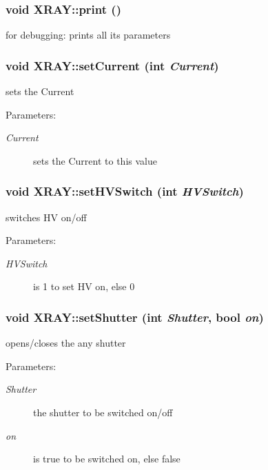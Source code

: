 \subsubsection{\setlength{\rightskip}{0pt plus 5cm}void XRAY::print ()}\label{classXRAY_c5f53a1db4eb027e141aa2e387868367}


for debugging: prints all its parameters 
\subsubsection{\setlength{\rightskip}{0pt plus 5cm}void XRAY::set\-Current (int {\em Current})}\label{classXRAY_aeeba93220502aa98d45e9b1702ed397}


sets the Current \begin{Desc}
\item[Parameters:]
\begin{description}
\item[{\em Current}]sets the Current to this value \end{description}
\end{Desc}
\subsubsection{\setlength{\rightskip}{0pt plus 5cm}void XRAY::set\-HVSwitch (int {\em HVSwitch})}\label{classXRAY_c47db1c445ac8ec6cf5dd74c3d4c6954}


switches HV on/off \begin{Desc}
\item[Parameters:]
\begin{description}
\item[{\em HVSwitch}]is 1 to set HV on, else 0 \end{description}
\end{Desc}
\subsubsection{\setlength{\rightskip}{0pt plus 5cm}void XRAY::set\-Shutter (int {\em Shutter}, bool {\em on})}\label{classXRAY_e5914387bcc62581145e1e079829f368}


opens/closes the any shutter \begin{Desc}
\item[Parameters:]
\begin{description}
\item[{\em Shutter}]the shutter to be switched on/off \item[{\em on}]is true to be switched on, else false \end{description}
\end{Desc}
